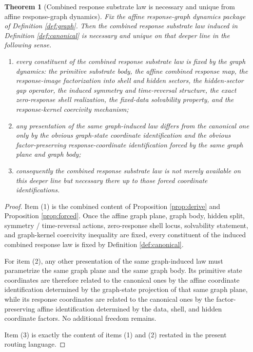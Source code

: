 \documentclass[11pt]{article}
\newtheorem{theorem}{Theorem}
\begin{document}
\begin{theorem}[Combined response substrate law is necessary and unique from affine response-graph dynamics]
\label{thm:necessity}
Fix the affine response-graph dynamics package of Definition \ref{def:graph}. Then the combined response substrate law induced in Definition \ref{def:canonical} is necessary and unique on that deeper line in the following sense.
\begin{enumerate}
    \item every constituent of the combined response substrate law is fixed by the graph dynamics: the primitive substrate body, the affine combined response map, the response-image factorization into shell and hidden sectors, the hidden-sector gap operator, the induced symmetry and time-reversal structure, the exact zero-response shell realization, the fixed-data solvability property, and the response-kernel coercivity mechanism;
    \item any presentation of the same graph-induced law differs from the canonical one only by the obvious graph-state coordinate identification and the obvious factor-preserving response-coordinate identification forced by the same graph plane and graph body;
    \item consequently the combined response substrate law is not merely available on this deeper line but necessary there up to those forced coordinate identifications.
\end{enumerate}
\end{theorem}

\begin{proof}
Item (1) is the combined content of Proposition \ref{prop:derive} and Proposition \ref{prop:forced}. Once the affine graph plane, graph body, hidden split, symmetry / time-reversal actions, zero-response shell locus, solvability statement, and graph-kernel coercivity inequality are fixed, every constituent of the induced combined response law is fixed by Definition \ref{def:canonical}.

For item (2), any other presentation of the same graph-induced law must parametrize the same graph plane and the same graph body. Its primitive state coordinates are therefore related to the canonical ones by the affine coordinate identification determined by the graph-state projection of that same graph plane, while its response coordinates are related to the canonical ones by the factor-preserving affine identification determined by the data, shell, and hidden coordinate factors. No additional freedom remains.

Item (3) is exactly the content of items (1) and (2) restated in the present routing language.
\end{proof}
\end{document}
